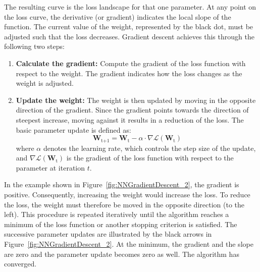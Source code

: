 The resulting curve is the loss landscape for that one parameter. At any point on the loss curve, the derivative (or gradient) indicates the local slope of the function.
The current value of the weight, represented by the black dot, must be adjusted such that the loss decreases. Gradient descent achieves this through the following two steps:
\begin{enumerate}
	\item \textbf{Calculate the gradient:} 
	Compute the gradient of the loss function with respect to the weight. 
	The gradient indicates how the loss changes as the weight is adjusted.
	\item \textbf{Update the weight:} The weight is then updated by moving in the opposite direction of the gradient. 
	Since the gradient points towards the direction of steepest increase, moving against it results in a reduction of the loss.
	The basic parameter update is defined as:
	\begin{equation}	
		\mathbf{W}_{\text{t+1}} = \mathbf{W}_{\text{t}} - \alpha \cdot \nabla \mathcal{L}(\mathbf{W}_{\text{t}})
	\end{equation}
	where $\alpha$ denotes the learning rate, which controls the step size of the update, and $\nabla \mathcal{L}(\mathbf{W}_{\text{t}})$ is the gradient of the loss function with respect to the parameter at iteration $t$.
\end{enumerate}



In the example shown in Figure~\ref{fig:NNGradientDescent_2}, the gradient is positive. Consequently, increasing the weight would increase the loss.
To reduce the loss, the weight must therefore be moved in the opposite direction (to the left). This procedure is repeated iteratively until the algorithm reaches a minimum of the loss function or another stopping criterion is satisfied. The successive parameter updates are illustrated by the black arrows in Figure~\ref{fig:NNGradientDescent_2}. At the minimum, the gradient and the slope are zero and the parameter update becomes zero as well. The algorithm has converged. 

